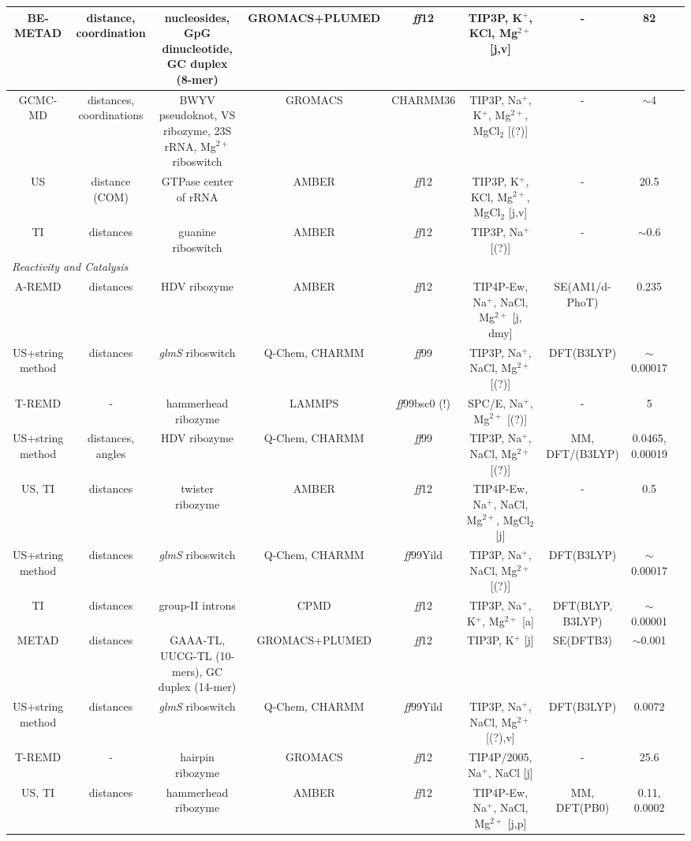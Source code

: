 \begin{tabular}{ccccccccc}
\midrule 
BE-METAD & distance, coordination & nucleosides, GpG dinucleotide, GC duplex (8-mer) & GROMACS+PLUMED & \emph{ff}12 & TIP3P, K$^{+}$, KCl, Mg$^{2+}$ {[}j,v{]} & - & 82 & \cite{cunha2016ions}\tabularnewline
\midrule 
GCMC-MD & distances, coordinations & BWYV pseudoknot, VS ribozyme, 23S rRNA, Mg$^{2+}$ riboswitch & GROMACS & CHARMM36 & TIP3P, Na$^{+}$, K$^{+}$, Mg$^{2+}$, MgCl$_{2}$ {[}(?){]} & - & $\sim$4 & \cite{lemkul2016characterization}\tabularnewline
\midrule 
US & distance (COM) & GTPase center of rRNA & AMBER & \emph{ff}12 & TIP3P, K$^{+}$, KCl, Mg$^{2+}$, MgCl$_{2}$ {[}j,v{]} & - & 20.5 & \cite{hayatshahi2017computational}\tabularnewline
\midrule 
TI & distances & guanine riboswitch & AMBER & \emph{ff}12 & TIP3P, Na$^{+}$ {[}(?){]} & - & $\sim$0.6 & \cite{hu2017ligand}\tabularnewline
\midrule 
\multicolumn{9}{l}{\emph{Reactivity and Catalysis}}\tabularnewline
\midrule 
A-REMD & distances & HDV ribozyme & AMBER & \emph{ff}12 & TIP4P-Ew, Na$^{+}$, NaCl, Mg$^{2+}$ {[}j, dmy{]} & SE(AM1/d-PhoT) & 0.235 & \cite{radak2015assessment}\tabularnewline
\midrule 
US+string method & distances & \emph{glmS} riboswitch & Q-Chem, CHARMM & \emph{ff}99 & TIP3P, Na$^{+}$, NaCl, Mg$^{2+}$ {[}(?){]} & DFT(B3LYP) & $\sim$0.00017 & \cite{zhang2015role}\tabularnewline
\midrule 
T-REMD & - & hammerhead ribozyme & LAMMPS & \emph{ff}99bsc0 (!) & SPC/E, Na$^{+}$, Mg$^{2+}$ {[}(?){]} & - & 5 & \cite{swadling2015structure}\tabularnewline
\midrule 
US+string method & distances, angles & HDV ribozyme & Q-Chem, CHARMM & \emph{ff}99 & TIP3P, Na$^{+}$, NaCl, Mg$^{2+}$ {[}(?){]} & MM, DFT/(B3LYP) & 0.0465, 0.00019 & \cite{thaplyal2015inverse}\tabularnewline
\midrule 
US, TI & distances & twister ribozyme & AMBER & \emph{ff}12 & TIP4P-Ew, Na$^{+}$, NaCl, Mg$^{2+}$, MgCl$_{2}$ {[}j{]} & - & 0.5 & \cite{gaines2016ribozyme}\tabularnewline
\midrule 
US+string method & distances & \emph{glmS} riboswitch & Q-Chem, CHARMM & \emph{ff}99Yild  & TIP3P, Na$^{+}$, NaCl, Mg$^{2+}$ {[}(?){]} & DFT(B3LYP) & $\sim$0.00017 & \cite{zhang2016assessing}\tabularnewline
\midrule 
TI & distances & group-II introns & CPMD & \emph{ff}12 & TIP3P, Na$^{+}$, K$^{+}$, Mg$^{2+}$ {[}a{]} & DFT(BLYP, B3LYP) & $\sim$0.00001 & \cite{casalino2016activates}\tabularnewline
\midrule 
METAD & distances & GAAA-TL, UUCG-TL (10-mers), GC duplex (14-mer) & GROMACS+PLUMED & \emph{ff}12 & TIP3P, K$^{+}$ {[}j{]} & SE(DFTB3) & $\sim$0.001 & \cite{mlynsky2016inline}\tabularnewline
\midrule 
US+string method & distances & \emph{glmS} riboswitch & Q-Chem, CHARMM & \emph{ff}99Yild  & TIP3P, Na$^{+}$, NaCl, Mg$^{2+}$ {[}(?),v{]} & DFT(B3LYP) & 0.0072 & \cite{bingaman2017glcn6p}\tabularnewline
\midrule 
T-REMD & - & hairpin ribozyme & GROMACS & \emph{ff}12 & TIP4P/2005, Na$^{+}$, NaCl {[}j{]} & - & 25.6 & \cite{schuabb2017pressure}\tabularnewline
\midrule 
US, TI & distances & hammerhead ribozyme & AMBER & \emph{ff}12 & TIP4P-Ew, Na$^{+}$, NaCl, Mg$^{2+}$ {[}j,p{]} & MM, DFT(PB0) & 0.11, 0.0002 & \cite{chen2017divalent}\tabularnewline
\bottomrule
\end{tabular}

